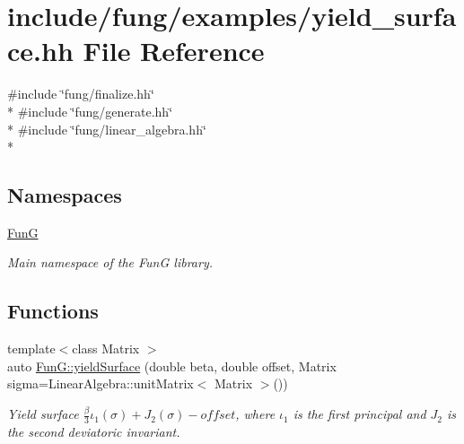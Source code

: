 \hypertarget{yield__surface_8hh}{}\section{include/fung/examples/yield\+\_\+surface.hh File Reference}
\label{yield__surface_8hh}
{\ttfamily \#include \char`\"{}fung/finalize.\+hh\char`\"{}}\\*
{\ttfamily \#include \char`\"{}fung/generate.\+hh\char`\"{}}\\*
{\ttfamily \#include \char`\"{}fung/linear\+\_\+algebra.\+hh\char`\"{}}\\*
\subsection*{Namespaces}
\begin{DoxyCompactItemize}
\item 
 \hyperlink{namespaceFunG}{FunG}
\begin{DoxyCompactList}\small\item\em Main namespace of the FunG library. \end{DoxyCompactList}\end{DoxyCompactItemize}
\subsection*{Functions}
\begin{DoxyCompactItemize}
\item 
{\footnotesize template$<$class Matrix $>$ }\\auto \hyperlink{namespaceFunG_a4784211358c877f05ad9426850303273}{Fun\+G\+::yield\+Surface} (double beta, double offset, Matrix sigma=Linear\+Algebra\+::unit\+Matrix$<$ Matrix $>$())
\begin{DoxyCompactList}\small\item\em Yield surface $ \frac{\beta}{3}\iota_1(\sigma) + J_2(\sigma)-offset $, where $\iota_1$ is the first principal and $J_2$ is the second deviatoric invariant. \end{DoxyCompactList}\end{DoxyCompactItemize}

